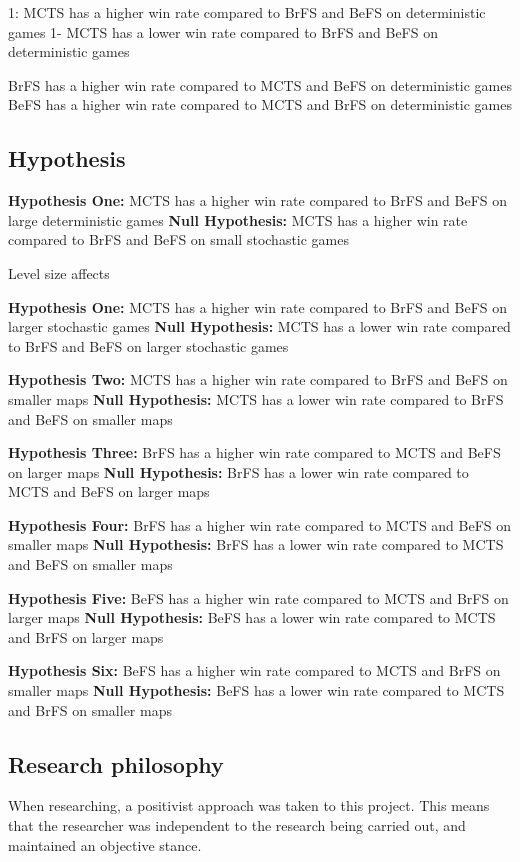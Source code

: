 \documentclass[journal]{IEEEtran}
\begin{document}


1: MCTS has a higher win rate compared to BrFS and BeFS on deterministic games
1- MCTS has a lower win rate compared to BrFS and BeFS on deterministic games

BrFS has a higher win rate compared to MCTS and BeFS on deterministic games
BeFS has a higher win rate compared to MCTS and BrFS on deterministic games

\subsection{Hypothesis}

	\textbf{Hypothesis One:}
		MCTS has a higher win rate compared to BrFS and BeFS on large deterministic games
	\textbf{Null Hypothesis:}
		MCTS has a higher win rate compared to BrFS and BeFS on small stochastic games

	Level size affects 

	\textbf{Hypothesis One:}
		MCTS has a higher win rate compared to BrFS and BeFS on larger stochastic games
	\textbf{Null Hypothesis:}
		MCTS has a lower win rate compared to BrFS and BeFS on larger stochastic games

	\textbf{Hypothesis Two:}
		MCTS has a higher win rate compared to BrFS and BeFS on smaller maps	
	\textbf{Null Hypothesis:}
		MCTS has a lower win rate compared to BrFS and BeFS on smaller maps

	\textbf{Hypothesis Three:}
		BrFS has a higher win rate compared to MCTS and BeFS on larger maps
	\textbf{Null Hypothesis:}
		BrFS has a lower win rate compared to MCTS and BeFS on larger maps

	\textbf{Hypothesis Four:}
		BrFS has a higher win rate compared to MCTS and BeFS on smaller maps
	\textbf{Null Hypothesis:}
		BrFS has a lower win rate compared to MCTS and BeFS on smaller maps

	\textbf{Hypothesis Five:}
		BeFS has a higher win rate compared to MCTS and BrFS on larger maps
	\textbf{Null Hypothesis:}
		BeFS has a lower win rate compared to MCTS and BrFS on larger maps
		
	\textbf{Hypothesis Six:}
		BeFS has a higher win rate compared to  MCTS and BrFS on smaller maps
	\textbf{Null Hypothesis:}
		BeFS has a lower win rate compared to  MCTS and BrFS on smaller maps


\subsection{Research philosophy}
	When researching, a positivist approach \cite{scientific-method, crossan2003research} was taken to this project. 
	This means that the researcher was independent to the research being carried out, and maintained an objective stance.
	
\end{document}
